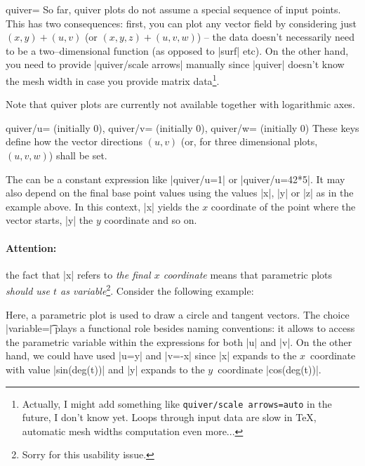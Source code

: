 {\begin{plottype}[/pgfplots]{quiver=\textcolor{black}{}}
	So far, quiver plots do not assume a special sequence of input points. This has two consequences: first, you can plot any vector field by considering just $(x,y) + (u,v)$ (or $(x,y,z) + (u,v,w)$) -- the data doesn't necessarily need to be a two--dimensional function (as opposed to |surf| etc). On the other hand, you need to provide |quiver/scale arrows| manually since |quiver| doesn't know the mesh width in case you provide matrix data\footnote{Actually, I might add something like \texttt{quiver/scale arrows=auto} in the future, I don't know yet. Loops through input data are slow in \TeX, automatic mesh widths computation even more...}.

	Note that quiver plots are currently not available together with logarithmic axes.

	\begin{pgfplotskeylist}{%
		quiver/u= (initially 0),
		quiver/v= (initially 0),
		quiver/w= (initially 0)}
		These keys define how the vector directions $(u,v)$ (or, for three dimensional plots, $(u,v,w)$) shall be set.

		The  can be a constant expression like |quiver/u=1| or |quiver/u=42*5|. It may also depend on the final base point values using the values |x|, |y| or |z| as in the example above. In this context, |x| yields the $x$ coordinate of the point where the vector starts, |y| the $y$ coordinate and so on. 

		\paragraph{Attention:} the fact that |x| refers to \emph{the final $x$ coordinate} means that parametric plots \emph{should use $t$ as variable}\footnote{Sorry for this usability issue.}. Consider the following example:
\begin{codeexample}[]
\end{codeexample}
	\noindent Here, a parametric plot is used to draw a circle and tangent vectors. The choice |variable=\t| plays a functional role besides naming conventions: it allows to access the parametric variable within the expressions for both |u| and |v|. On the other hand, we could have used |u=y| and |v=-x| since |x| expands to the $x$~coordinate with value |sin(deg(t))| and |y| expands to the $y$~coordinate |cos(deg(t))|.
		

\end{pgfplotskeylist}
\end{plottype}}
